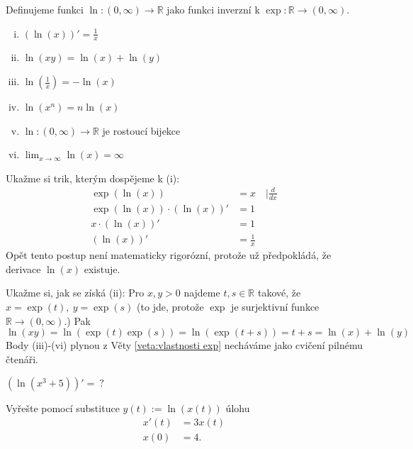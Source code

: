 \begin{definice}
  Definujeme funkci $\ln\colon (0,\infty)\to \mathbb{R}$ jako funkci inverzní k $\exp\colon \mathbb{R}\to (0,\infty).$
\end{definice}

\begin{věta}\label{veta:vlastnosti prirozeneho logaritmu}\leavevmode
\begin{enumerate}[(i)]
  \item $(\ln(x))'=\frac{1}{x}$
  \item $\ln(xy)=\ln(x)+\ln(y)$
  \item $\ln\left(\frac{1}{x}\right)=-\ln(x)$
  \item $\ln(x^{n})=n \ln(x)$
  \item $\ln\colon (0,\infty)\to \mathbb{R}$ je rostoucí bijekce
  \item $\displaystyle\lim_{x\to \infty}\ln(x)=\infty$
\end{enumerate}
\end{věta}
\begin{náčrt důkazu}
Ukažme si trik, kterým dospějeme k (i):
  \begin{align*}
	  \exp(\ln(x)) &= x\hspace{1em} \rvert \frac{d}{dx} \\
  	\exp(\ln(x))\cdot(\ln(x))' &= 1 \\
	x \cdot(\ln(x))' &= 1 \\
	(\ln(x))' &= \frac{1}{x}
  \end{align*}
  Opět tento postup není matematicky rigorózní, protože už předpokládá, že derivace $\ln(x)$ existuje.

Ukažme si, jak se získá (ii): Pro $x,y>0$ najdeme $t,s\in \mathbb{R}$ takové, že $x=\exp(t),\ y=\exp(s)$ (to jde, protože $\exp$ je surjektivní funkce $\mathbb{R}\to (0,\infty).$) Pak
\begin{equation*}
  \ln(xy)=\ln(\exp(t)\exp(s))=\ln(\exp(t+s))=t+s=\ln(x)+\ln(y)
\end{equation*}
Body (iii)-(vi) plynou z Věty \ref{veta:vlastnosti exp} necháváme jako cvičení pilnému čtenáři.
\end{náčrt důkazu}

\begin{úloha}
	$(\ln(x^{3}+5))'=\ ?$
\end{úloha}

\begin{úloha}
Vyřešte pomocí substituce $y(t):= \ln(x(t))$ úlohu
\begin{align*}
	x'(t) &= 3x(t) \\
	x(0) &= 4.
\end{align*}
\end{úloha}


